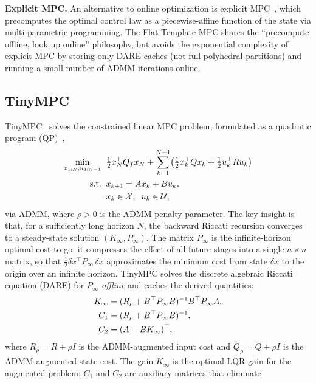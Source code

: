 \textbf{Explicit MPC.}
An alternative to online optimization is explicit MPC~\cite{bemporad2002},
which precomputes the optimal control law as a piecewise-affine
function of the state via multi-parametric programming.
The Flat Template MPC shares the ``precompute offline, look up online''
philosophy, but avoids the exponential complexity of explicit MPC
by storing only DARE caches (not full polyhedral partitions)
and running a small number of ADMM iterations online.

\subsection{TinyMPC}\label{sec:tinympc_background}

TinyMPC~\cite{tinympc} solves the constrained linear MPC problem,
formulated as a quadratic program (QP)~\cite{osqp,boyd2011},
\begin{align}
  \min_{x_{1:N}, u_{1:N-1}} \;\;
  & \tfrac{1}{2} x_N^\top Q_f x_N
    + \sum_{k=1}^{N-1} \bigl(
      \tfrac{1}{2} x_k^\top Q x_k
      + \tfrac{1}{2} u_k^\top R u_k \bigr) \notag \\
  \text{s.t.} \;\;
  & x_{k+1} = A x_k + B u_k, \notag \\
  & x_k \in \mathcal{X},\;\; u_k \in \mathcal{U},
  \label{eq:mpc}
\end{align}
via ADMM, where $\rho > 0$ is the ADMM penalty parameter.
The key insight is that, for a sufficiently long horizon $N$,
the backward Riccati recursion converges to a steady-state
solution $(K_\infty, P_\infty)$.
The matrix $P_\infty$ is the infinite-horizon optimal
cost-to-go: it compresses the effect of all future stages
into a single $n \times n$ matrix, so that
$\frac{1}{2} \delta x^\top P_\infty \, \delta x$ approximates
the minimum cost from state $\delta x$ to the origin
over an infinite horizon.
TinyMPC solves the discrete algebraic Riccati equation (DARE)
for $P_\infty$ \emph{offline} and caches the derived quantities:
\begin{align}
  K_\infty &= (R_\rho + B^\top P_\infty B)^{-1} B^\top P_\infty A, \label{eq:kinf} \\
  C_1      &= (R_\rho + B^\top P_\infty B)^{-1}, \notag \\
  C_2      &= (A - B K_\infty)^\top, \notag
\end{align}
where $R_\rho = R + \rho I$ is the ADMM-augmented input cost
and $Q_\rho = Q + \rho I$ is the ADMM-augmented state cost.
The gain $K_\infty$ is the optimal LQR gain for the augmented
problem; $C_1$ and $C_2$ are auxiliary matrices that eliminate
